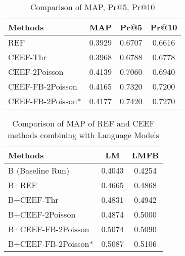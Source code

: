 \begin{table}
	\centering
	\begin{tabular}{lS[tabnumalign=centre,tabformat=1.4,decimalsymbol=comma]S[tabnumalign=centre,tabformat=1.4,decimalsymbol=comma]S[tabnumalign=centre,tabformat=1.4,decimalsymbol=comma]}
		\toprule
		Methods & {MAP} & {Pr@5} & {Pr@10}\\
		\midrule
		REF & 0.3929 & 0.6707 & 0.6616\\
		CEEF-Thr & 0.3968 & 0.6788 & 0.6778\\
		CEEF-2Poisson & 0.4139 & 0.7060 & 0.6940\\
		CEEF-FB-2Poisson & 0.4165 & 0.7320 & 0.7200\\
		CEEF-FB-2Poisson* & 0.4177 & 0.7420 & 0.7270\\
		\bottomrule
	\end{tabular}
	\caption{Comparison of MAP, Pr@5, Pr@10}
	\cite{paper:NaNg}
\end{table}



\begin{table}
	\centering
	\begin{tabular}{lS[tabnumalign=centre,tabformat=1.4,decimalsymbol=comma]S[tabnumalign=centre,tabformat=1.4,decimalsymbol=comma]}
		\toprule
		Methods & {LM} & {LMFB} \\
		\midrule
		B (Baseline Run) & 0.4043 & 0.4254 \\
		B+REF & 0.4665 & 0.4868 \\
		B+CEEF-Thr & 0.4831 & 0.4942 \\
		B+CEEF-2Poisson & 0.4874 & 0.5000 \\
		B+CEEF-FB-2Poisson & 0.5074 & 0.5090 \\
		B+CEEF-FB-2Poisson* & 0.5087 & 0.5106 \\
		\bottomrule
	\end{tabular}
	\caption{Comparison of MAP of REF and CEEF methods combining with Language Models}
	\cite{paper:NaNg}
\end{table}





